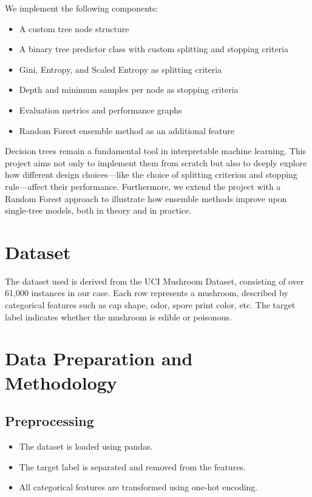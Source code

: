 \documentclass[11pt]{article}
\begin{document}
We implement the following components:
\begin{itemize}
    \item A custom tree node structure
    \item A binary tree predictor class with custom splitting and stopping criteria
    \item Gini, Entropy, and Scaled Entropy as splitting criteria
    \item Depth and minimum samples per node as stopping criteria
    \item Evaluation metrics and performance graphs
    \item Random Forest ensemble method as an additional feature
\end{itemize}

Decision trees remain a fundamental tool in interpretable machine learning. This project aims not only to implement them from scratch but also to deeply explore how different design choices—like the choice of splitting criterion and stopping rule—affect their performance. Furthermore, we extend the project with a Random Forest approach to illustrate how ensemble methods improve upon single-tree models, both in theory and in practice.

\section{Dataset}
The dataset used is derived from the UCI Mushroom Dataset, consisting of over 61,000 instances in our case. Each row represents a mushroom, described by categorical features such as cap shape, odor, spore print color, etc. The target label indicates whether the mushroom is edible or poisonous.

\section{Data Preparation and Methodology}
\subsection{Preprocessing}
\begin{itemize}
    \item The dataset is loaded using pandas.
    \item The target label is separated and removed from the features.
    \item All categorical features are transformed using one-hot encoding.
\end{itemize}
\end{document}
